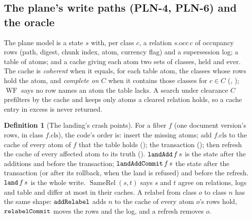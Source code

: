 \documentclass[11pt]{article}
\theoremstyle{plain}
\theoremstyle{definition}
\newtheorem{definition}[theorem]{Definition}
\theoremstyle{remark}
\newcommand{\mlean}[1]{\text{\texttt{#1}}}
\begin{document}
\subsection{The plane's write paths (PLN-4, PLN-6) and the oracle}

The plane model is a state $s$ with, per class $c$, a relation $s.\mathrm{occ}\,c$ of occupancy
rows (path, digest, chunk index, atom, currency flag) and a supersession log; a table of atoms;
and a cache giving each atom two sets of classes, $\mathrm{held}$ and $\mathrm{ever}$. The cache
is \emph{coherent} when it equals, for each table atom, the classes whose rows hold the atom, and
\emph{complete on $C$} when it contains those classes for $c \in C$
(, ); $\operatorname{WF}$ says no row
names an atom the table lacks. A search under clearance $C$ prefilters by the cache and keeps only
atoms a cleared relation holds, so a cache entry in excess is never returned.

\begin{definition}[The landing's crash points]
For a fiber $f$ (one document version's rows, in class $f.\mathrm{cls}$), the code's order is:
insert the missing atoms; add $f.\mathrm{cls}$ to the cache of every atom of $f$ that the table
holds (); the transaction (); then refresh the cache of every affected
atom to its truth (). $\mlean{landAdd}\,f\,s$ is the state after the additions and
before the transaction; $\mlean{landAddCommit}\,f\,s$ the state after the transaction (or after
its rollback, when the land is refused) and before the refresh. $\mlean{land}\,f\,s$ is the whole
write. $\operatorname{SameRel}(s, t)$ says $s$ and $t$ agree on relations, logs and table and
differ at most in their caches. A relabel from class $o$ to class $n$ has the same shape:
$\mlean{addRelabel}$ adds $n$ to the cache of every atom $o$'s rows hold, $\mlean{relabelCommit}$
moves the rows and the log, and a refresh removes $o$.
\end{definition}
\end{document}
